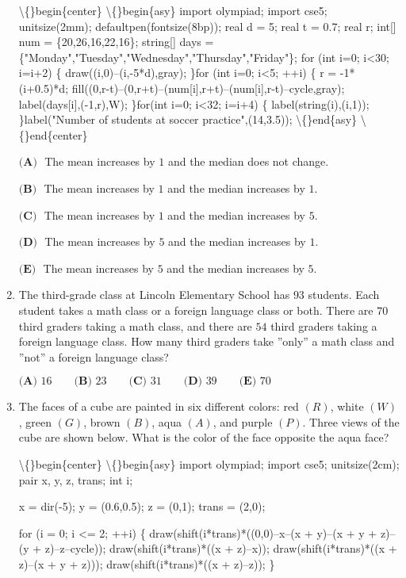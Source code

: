 \documentclass{article}
\begin{document}
\begin{enumerate}[label=\arabic*., itemsep=0.5em]
\textbackslash\{\}begin\{center\}
\textbackslash\{\}begin\{asy\}
import olympiad;
import cse5;
unitsize(2mm);
defaultpen(fontsize(8bp));
real d = 5;
real t = 0.7;
real r;
int[] num = \{20,26,16,22,16\};
string[] days = \{"Monday","Tuesday","Wednesday","Thursday","Friday"\};
for (int i=0; i<30;
i=i+2) \{ draw((i,0)--(i,-5*d),gray);
\}for (int i=0;
i<5;
++i) \{   r = -1*(i+0.5)*d;
fill((0,r-t)--(0,r+t)--(num[i],r+t)--(num[i],r-t)--cycle,gray);
label(days[i],(-1,r),W);
\}for(int i=0;
i<32;
i=i+4) \{ label(string(i),(i,1));
\}label("Number of students at soccer practice",(14,3.5));
\textbackslash\{\}end\{asy\}
\textbackslash\{\}end\{center\}


\(\textbf{(A) }\) The mean increases by \(1\) and the median does not change.

\(\textbf{(B) }\) The mean increases by \(1\) and the median increases by \(1\).

\(\textbf{(C) }\) The mean increases by \(1\) and the median increases by \(5\).

\(\textbf{(D) }\) The mean increases by \(5\) and the median increases by \(1\).

\(\textbf{(E) }\) The mean increases by \(5\) and the median increases by \(5\).\par \vspace{0.5em}\item The third-grade class at Lincoln Elementary School has \(93\) students. Each student takes a math class or a foreign language class or both. There are \(70\) third graders taking a math class, and there are \(54\) third graders taking a foreign language class. How many third graders take ''only'' a math class and ''not'' a foreign language class?

\(\textbf{(A) }16\qquad\textbf{(B) }23\qquad\textbf{(C) }31\qquad\textbf{(D) }39\qquad\textbf{(E) }70\)\par \vspace{0.5em}\item The faces of a cube are painted in six different colors: red \((R)\), white \((W)\), green \((G)\), brown \((B)\), aqua \((A)\), and purple \((P)\). Three views of the cube are shown below. What is the color of the face opposite the aqua face?


\textbackslash\{\}begin\{center\}
\textbackslash\{\}begin\{asy\}
import olympiad;
import cse5;
unitsize(2cm);
pair x, y, z, trans;
int i;

x = dir(-5);
y = (0.6,0.5);
z = (0,1);
trans = (2,0);

for (i = 0; i <= 2; ++i) \{
draw(shift(i*trans)*((0,0)--x--(x + y)--(x + y + z)--(y + z)--z--cycle));
draw(shift(i*trans)*((x + z)--x));
draw(shift(i*trans)*((x + z)--(x + y + z)));
draw(shift(i*trans)*((x + z)--z));
\}


\end{enumerate}
\end{document}
